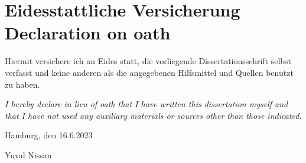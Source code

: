 \fancyhead{}
\renewcommand{\headrulewidth}{0pt}

\thispagestyle{plain}
\chapter*{Eidesstattliche Versicherung \\ Declaration on oath}

Hiermit versichere ich an Eides statt, die vorliegende Dissertationsschrift selbst verfasst und
keine anderen als die angegebenen Hilfsmittel und Quellen benutzt zu haben.

\emph{I hereby declare in lieu of oath that I have written this dissertation myself and that I have not used any auxiliary materials or sources other than those indicated.}


\vspace{1cm}

Hamburg, den 16.6.2023

\vspace{3cm}

\hspace{8cm} \hdashrule{7cm}{1pt}{1pt}

\vspace{0.1cm}

\hspace{10.2cm} Yuval Nissan


\clearpage
\thispagestyle{plain}
\newpage
\thispagestyle{plain}
\mbox{~}
\clearpage
\thispagestyle{plain}
\newpage
\thispagestyle{plain}

